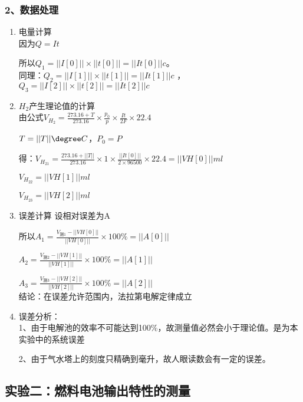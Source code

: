     \subsubsection*{2、数据处理}
    \begin{enumerate}
        \item 电量计算\\
        因为$Q=It$

        所以${Q}_{1}=||I[0]||\times||t[0]|| = ||It[0]||c$。\\
        \indent 同理：${Q}_{2}=||I[1]||\times||t[1]|| = ||It[1]||c$
        ，${Q}_{3}=||I[2]||\times||t[2]|| = ||It[2]||c$

        \item ${H}_{2}$产生理论值的计算\\
        由公式${V}_{{H}_{2}}=\frac{273.16+T}{273.16}\times\frac{{p}_{0}}{p}\times\frac{It}{2F}\times22.4$

        $T=||T||\degree C$，${P}_{0}=P$

        得：${V}_{{H}_{21}}=\frac{273.16+||T||}{273.16}\times1\times\frac{||It[0]||}{2\times96500}\times22.4 = ||VH[0]||ml$

        ${V}_{{H}_{22}} = ||VH[1]||ml$

        ${V}_{{H}_{23}} = ||VH[2]||ml$

        \item 误差计算
        设相对误差为A

        所以${A}_{1}=\frac{{V}_{\text{测1}}-||VH[0]||}{||VH[0]||}\times100\% = ||A[0]||$

        ${A}_{2}=\frac{{V}_{\text{测2}}-||VH[1]||}{||VH[1]||}\times100\% = ||A[1]||$

        ${A}_{3}=\frac{{V}_{\text{测3}}-||VH[2]||}{||VH[2]||}\times100\% = ||A[2]||$\\

        结论：在误差允许范围内，法拉第电解定律成立

        \item 误差分析：\\

        1、由于电解池的效率不可能达到100\%，故测量值必然会小于理论值。是为本实验中的系统误差

        2、由于气水塔上的刻度只精确到毫升，故人眼读数会有一定的误差。
    \end{enumerate}

    \subsection*{实验二：燃料电池输出特性的测量}
